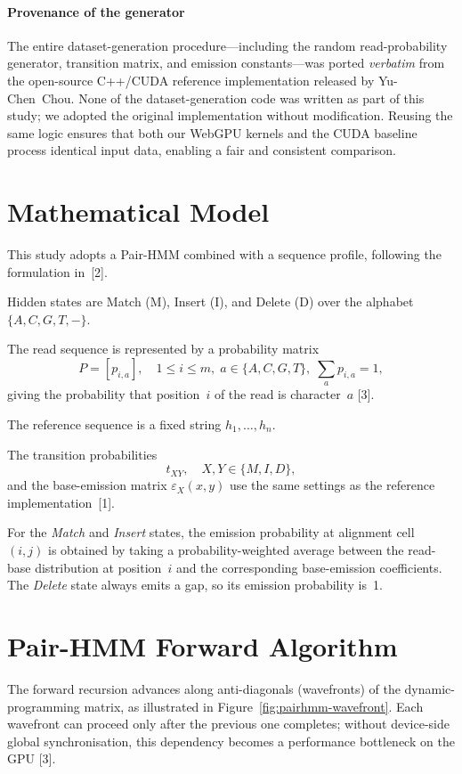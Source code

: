 \documentclass[PhD]{PHlab-thesis}
\begin{document}
\paragraph{Provenance of the generator}%
The entire dataset-generation procedure—including the random
read-probability generator, transition matrix, and emission constants—was
ported \emph{verbatim} from the open-source C++/CUDA reference
implementation released by Yu-Chen~Chou\cite{chou2024}.
None of the dataset-generation code was written as part of this study; we
adopted the original implementation without modification.
Reusing the same logic ensures that both our WebGPU kernels and the CUDA
baseline process identical input data, enabling a fair and consistent
comparison.


\section{Mathematical Model}
This study adopts a Pair-HMM combined with a sequence profile, following
the formulation in~[2].

Hidden states are Match (M), Insert (I), and Delete (D) over the alphabet
$\{A,C,G,T,-\}$.

The read sequence is represented by a probability matrix
\[
P = [p_{i,a}], \quad 1 \le i \le m,\;
a \in \{A,C,G,T\},\;
\sum_a p_{i,a} = 1,
\]
giving the probability that position~$i$ of the read is character~$a$
[3].

The reference sequence is a fixed string $h_1,\dots,h_n$.

The transition probabilities
\[
t_{XY}, \quad X,Y \in \{M,I,D\},
\]
and the base-emission matrix $\varepsilon_X(x,y)$ use the same settings
as the reference implementation~[1].

For the \emph{Match} and \emph{Insert} states, the emission probability at
alignment cell~$(i,j)$ is obtained by taking a probability-weighted average
between the read-base distribution at position~$i$ and the corresponding
base-emission coefficients.  
The \emph{Delete} state always emits a gap, so its emission probability is~1.


\section{Pair-HMM Forward Algorithm}
The forward recursion advances along anti-diagonals (wavefronts) of the
dynamic-programming matrix, as illustrated in
Figure~\ref{fig:pairhmm-wavefront}.
Each wavefront can proceed only after the previous one completes;
without device-side global synchronisation, this dependency becomes a
performance bottleneck on the GPU [3].
\end{document}
